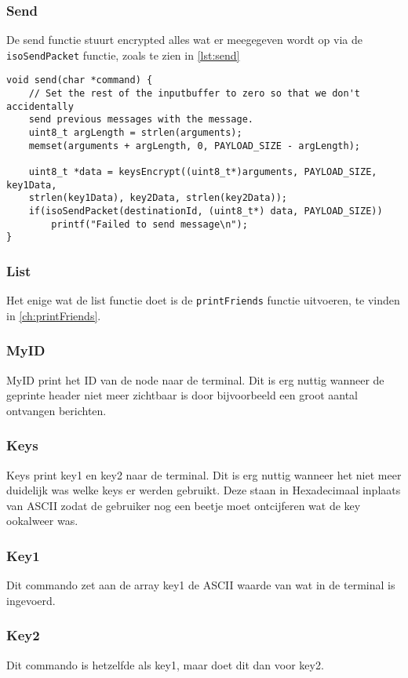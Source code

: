 \subsubsection{Send}
De send functie stuurt encrypted alles wat er meegegeven wordt op via de \texttt{isoSendPacket} functie, zoals te zien in \autoref{lst:send}
\begin{lstlisting}[caption={De send functie},captionpos=b,label={lst:send},style=c,xleftmargin=.\textwidth,xrightmargin=.\textwidth]
void send(char *command) {
    // Set the rest of the inputbuffer to zero so that we don't accidentally 
    send previous messages with the message.
    uint8_t argLength = strlen(arguments);
    memset(arguments + argLength, 0, PAYLOAD_SIZE - argLength);

    uint8_t *data = keysEncrypt((uint8_t*)arguments, PAYLOAD_SIZE, key1Data, 
    strlen(key1Data), key2Data, strlen(key2Data));
    if(isoSendPacket(destinationId, (uint8_t*) data, PAYLOAD_SIZE)) 
        printf("Failed to send message\n");      
}
\end{lstlisting}


\subsubsection{List}
Het enige wat de list functie doet is de \texttt{printFriends} functie uitvoeren, te vinden in \autoref{ch:printFriends}.


\subsubsection{MyID}
MyID print het ID van de node naar de terminal. Dit is erg nuttig wanneer de geprinte header niet meer zichtbaar is door bijvoorbeeld een groot aantal ontvangen berichten.

\subsubsection{Keys}
Keys print key1 en key2 naar de terminal. Dit is erg nuttig wanneer het niet meer duidelijk was welke keys er werden gebruikt. Deze staan in Hexadecimaal inplaats van ASCII zodat de gebruiker nog een beetje moet ontcijferen wat de key ookalweer was.

\subsubsection{Key1}
Dit commando zet aan de array key1 de ASCII waarde van wat in de terminal is ingevoerd. 

\subsubsection{Key2}
Dit commando is hetzelfde als key1, maar doet dit dan voor key2.